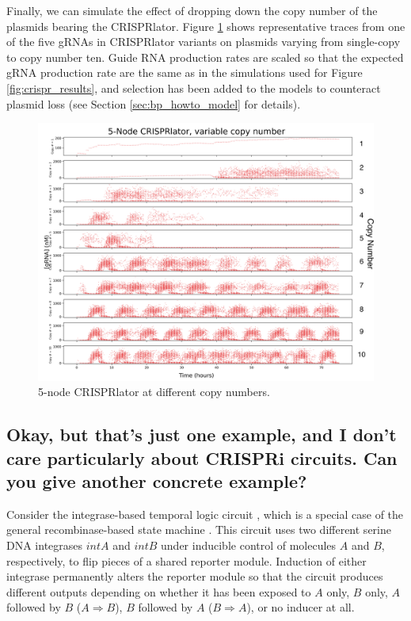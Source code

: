 \documentclass[preprint,12pt]{oldplainarticle}
\begin{document}
Finally, we can simulate the effect of dropping down the copy number of the plasmids bearing the CRISPRlator. Figure \ref{fig:crispr_results_2} shows representative traces from one of the five gRNAs in CRISPRlator variants on plasmids varying from single-copy to copy number ten. Guide RNA production rates are scaled so that the expected gRNA production rate are the same as in the simulations used for Figure \ref{fig:crispr_results}, and selection has been added to the models to counteract plasmid loss (see Section \ref{sec:bp_howto_model} for details). 

\begin{figure}[!ht]
\centering
\includegraphics[scale=1]{figures/crispr_results_2.png}
\caption{5-node CRISPRlator at different copy numbers.}
\label{fig:crispr_results_2}
\end{figure}

\subsection{Okay, but that's just one example, and I don't care particularly about CRISPRi circuits. Can you give another concrete example?}\label{ss:temporal_gate}

Consider the integrase-based temporal logic circuit \citep{hsiao2016}, which is a special case of the general recombinase-based state machine \citep{roquet2016}. This circuit uses two different serine DNA integrases $intA$ and $intB$ under inducible control of molecules $A$ and $B$, respectively, to flip pieces of a shared reporter module. Induction of either integrase permanently alters the reporter module so that the circuit produces different outputs depending on whether it has been exposed to $A$ only, $B$ only, $A$ followed by $B$ ($A\Rightarrow B$), $B$ followed by $A$ ($B \Rightarrow A$), or no inducer at all.
\end{document}
